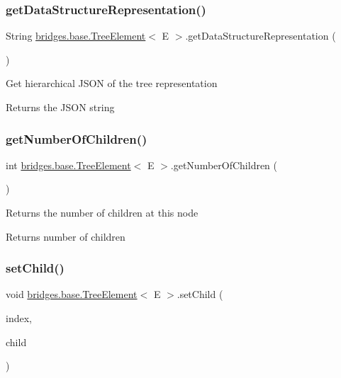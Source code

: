 \subsubsection{\texorpdfstring{getDataStructureRepresentation()}{getDataStructureRepresentation()}}
{\footnotesize\ttfamily String \mbox{\hyperlink{classbridges_1_1base_1_1_tree_element}{bridges.\+base.\+Tree\+Element}}$<$ E $>$.get\+Data\+Structure\+Representation (\begin{DoxyParamCaption}{ }\end{DoxyParamCaption})}

Get hierarchical J\+S\+ON of the tree representation

\begin{DoxyReturn}{Returns}
the J\+S\+ON string 
\end{DoxyReturn}
\mbox{\label{classbridges_1_1base_1_1_tree_element_a3722c7cec66ff297f999870df0da3cff}} 
\subsubsection{\texorpdfstring{getNumberOfChildren()}{getNumberOfChildren()}}
{\footnotesize\ttfamily int \mbox{\hyperlink{classbridges_1_1base_1_1_tree_element}{bridges.\+base.\+Tree\+Element}}$<$ E $>$.get\+Number\+Of\+Children (\begin{DoxyParamCaption}{ }\end{DoxyParamCaption})}

Returns the number of children at this node

\begin{DoxyReturn}{Returns}
number of children 
\end{DoxyReturn}
\mbox{\label{classbridges_1_1base_1_1_tree_element_aefafebb19d64398d150e464e4361ddf0}} 
\subsubsection{\texorpdfstring{setChild()}{setChild()}}
{\footnotesize\ttfamily void \mbox{\hyperlink{classbridges_1_1base_1_1_tree_element}{bridges.\+base.\+Tree\+Element}}$<$ E $>$.set\+Child (\begin{DoxyParamCaption}\item[{int}]{index,  }\item[{\mbox{\hyperlink{classbridges_1_1base_1_1_tree_element}{Tree\+Element}}$<$ E $>$}]{child }\end{DoxyParamCaption})}

